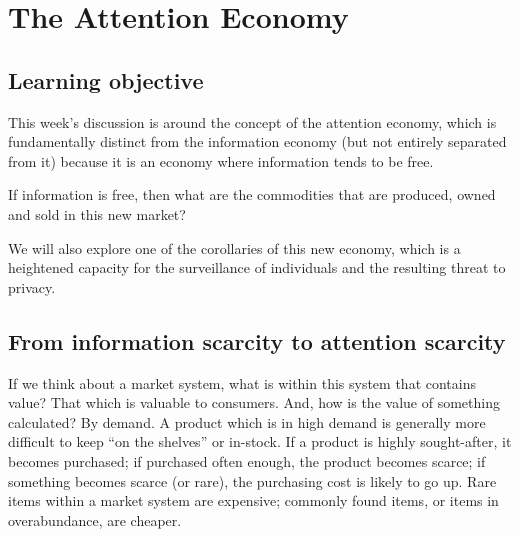 \documentclass[
  letterpaper,
  DIV=11,
  numbers=noendperiod]{scrreprt}
\begin{document}

\chapter{The Attention Economy}\label{the-attention-economy}

\section{Learning objective}\label{learning-objective-1}

This week's discussion is around the concept of the attention economy,
which is fundamentally distinct from the information economy (but not
entirely separated from it) because it is an economy where information
tends to be free.

\begin{tcolorbox}[enhanced jigsaw, arc=.35mm, bottomrule=.15mm, bottomtitle=1mm, breakable, colback=white, colbacktitle=quarto-callout-tip-color!10!white, colframe=quarto-callout-tip-color-frame, coltitle=black, left=2mm, leftrule=.75mm, opacityback=0, opacitybacktitle=0.6, rightrule=.15mm, title=\textcolor{quarto-callout-tip-color}{\faLightbulb}\hspace{0.5em}{Pause and reflect}, titlerule=0mm, toprule=.15mm, toptitle=1mm]

If information is free, then what are the commodities that are produced,
owned and sold in this new market?

\end{tcolorbox}

We will also explore one of the corollaries of this new economy, which
is a heightened capacity for the surveillance of individuals and the
resulting threat to privacy.

\section{From information scarcity to attention
scarcity}\label{from-information-scarcity-to-attention-scarcity}

If we think about a market system, what is within this system that
contains value? That which is valuable to consumers. And, how is the
value of something calculated? By demand. A product which is in high
demand is generally more difficult to keep ``on the shelves'' or
in-stock. If a product is highly sought-after, it becomes purchased; if
purchased often enough, the product becomes scarce; if something becomes
scarce (or rare), the purchasing cost is likely to go up. Rare items
within a market system are expensive; commonly found items, or items in
overabundance, are cheaper.~~
\end{document}
